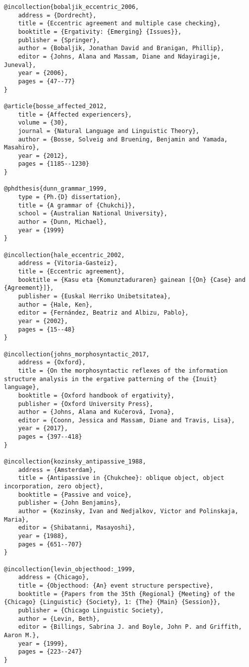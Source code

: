 \documentclass[output=paper,modfonts,nonflat]{langsci/langscibook}
\begin{document}
\begin{verbatim}
@incollection{bobaljik_eccentric_2006,
	address = {Dordrecht},
	title = {Eccentric agreement and multiple case checking},
	booktitle = {Ergativity: {Emerging} {Issues}},
	publisher = {Springer},
	author = {Bobaljik, Jonathan David and Branigan, Phillip},
	editor = {Johns, Alana and Massam, Diane and Ndayiragije, Juneval},
	year = {2006},
	pages = {47--77}
}

@article{bosse_affected_2012,
	title = {Affected experiencers},
	volume = {30},
	journal = {Natural Language and Linguistic Theory},
	author = {Bosse, Solveig and Bruening, Benjamin and Yamada, Masahiro},
	year = {2012},
	pages = {1185--1230}
}

@phdthesis{dunn_grammar_1999,
	type = {Ph.{D} dissertation},
	title = {A grammar of {Chukchi}},
	school = {Australian National University},
	author = {Dunn, Michael},
	year = {1999}
}

@incollection{hale_eccentric_2002,
	address = {Vitoria-Gasteiz},
	title = {Eccentric agreement},
	booktitle = {Kasu eta {Komunztaduraren} gainean [{On} {Case} and {Agreement}]},
	publisher = {Euskal Herriko Unibetsitatea},
	author = {Hale, Ken},
	editor = {Fernández, Beatriz and Albizu, Pablo},
	year = {2002},
	pages = {15--48}
}

@incollection{johns_morphosyntactic_2017,
	address = {Oxford},
	title = {On the morphosyntactic reflexes of the information structure analysis in the ergative patterning of the {Inuit} language},
	booktitle = {Oxford handbook of ergativity},
	publisher = {Oxford University Press},
	author = {Johns, Alana and Kučerová, Ivona},
	editor = {Coonn, Jessica and Massam, Diane and Travis, Lisa},
	year = {2017},
	pages = {397--418}
}

@incollection{kozinsky_antipassive_1988,
	address = {Amsterdam},
	title = {Antipassive in {Chukchee}: oblique object, object incorporation, zero object},
	booktitle = {Passive and voice},
	publisher = {John Benjamins},
	author = {Kozinsky, Ivan and Nedjalkov, Victor and Polinskaja, Maria},
	editor = {Shibatanni, Masayoshi},
	year = {1988},
	pages = {651--707}
}

@incollection{levin_objecthood:_1999,
	address = {Chicago},
	title = {Objecthood: {An} event structure perspective},
	booktitle = {Papers from the 35th {Regional} {Meeting} of the {Chicago} {Linguistic} {Society}, 1: {The} {Main} {Session}},
	publisher = {Chicago Linguistic Society},
	author = {Levin, Beth},
	editor = {Billings, Sabrina J. and Boyle, John P. and Griffith, Aaron M.},
	year = {1999},
	pages = {223--247}
}


\end{verbatim}
\end{document}
